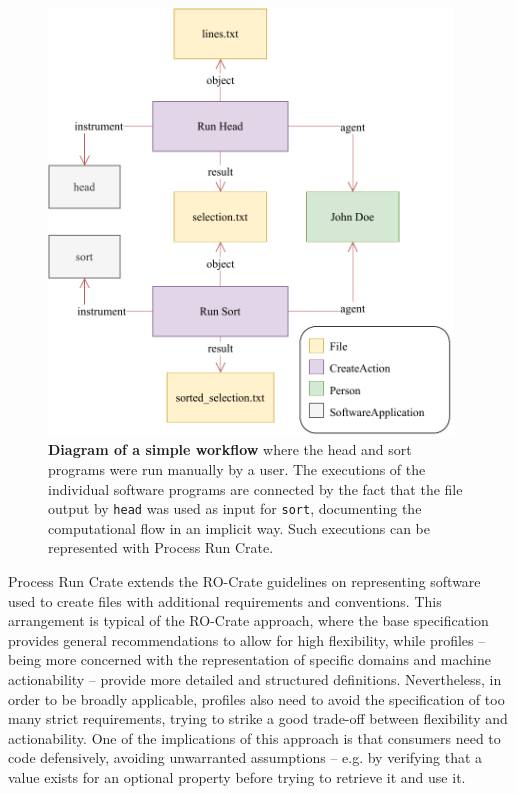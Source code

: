 \documentclass[10pt,letterpaper]{article}
\begin{document}
\begin{figure}[!ht]
\includegraphics[width=29em]{wrroc-figure-example.drawio.pdf}
\caption{{\bf Diagram of a simple workflow} where the head and sort programs were run manually by a user.
The executions of the individual software programs are connected by the fact that the file output by \texttt{head} was used as input for \texttt{sort}, documenting the computational flow in an implicit way.
Such executions can be represented with Process Run Crate.}
\label{fig:head_sort}
\end{figure}


Process Run Crate extends the RO-Crate guidelines on representing software used to create files with additional requirements and conventions.
This arrangement is typical of the RO-Crate approach, where the base specification provides general recommendations to allow for high flexibility, while profiles -- being more concerned with the representation of specific domains and machine actionability -- provide more detailed and structured definitions.
Nevertheless, in order to be broadly applicable, profiles also need to avoid the specification of too many strict requirements, trying to strike a good trade-off between flexibility and actionability.
One of the implications of this approach is that consumers need to code defensively, avoiding unwarranted assumptions -- e.g. by verifying that a value exists for an optional property before trying to retrieve it and use it.
\end{document}
